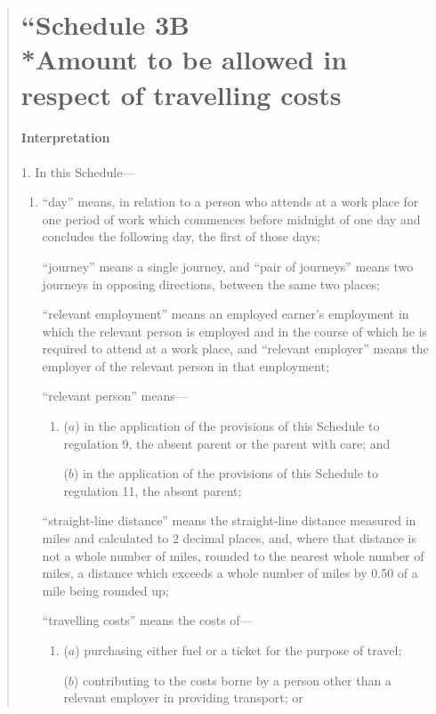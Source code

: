 \documentclass[12pt,a4paper]{article}
\begin{document}
\begin{quotation}
\part*{``Schedule 3B\\*Amount to be allowed in respect of travelling costs}

\subsection*{Interpretation}

1.  In this Schedule—
\begin{enumerate}\item[]
“day” means, in relation to a person who attends at a work place for one period of work which commences before midnight of one day and concludes the following day, the first of those days;

“journey” means a single journey, and “pair of journeys” means two journeys in opposing directions, between the same two places;

“relevant employment” means an employed earner’s employment in which the relevant person is employed and in the course of which he is required to attend at a work place, and “relevant employer” means the employer of the relevant person in that employment;

“relevant person” means—
\begin{enumerate}\item[]
($a$) in the application of the provisions of this Schedule to regulation 9, the absent parent or the parent with care; and

($b$) in the application of the provisions of this Schedule to regulation 11, the absent parent;
\end{enumerate}

“straight-line distance” means the straight-line distance measured in miles and calculated to 2 decimal places, and, where that distance is not a whole number of miles, rounded to the nearest whole number of miles, a distance which exceeds a whole number of miles by 0.50 of a mile being rounded up;

“travelling costs” means the costs of—
\begin{enumerate}\item[]
($a$) purchasing either fuel or a ticket for the purpose of travel;

($b$) contributing to the costs borne by a person other than a relevant employer in providing transport; or


\end{enumerate}
\end{enumerate}
\end{quotation}
\end{document}
